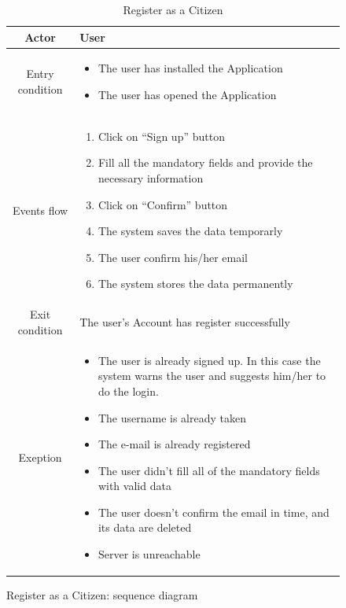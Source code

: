 \documentclass{article}
\begin{document}
	\begin{figure}[H]
	
		\begin{table} [H]
		\begin{center}
		\caption{Register as a Citizen}
		\begin{tabular}{|c|p{8cm}|}
			\hline
			Actor			&	User\\
			\hline
			Entry condition	&	\begin{itemize}[noitemsep,topsep=0pt]
									\item The user has installed the Application
									\item The user has opened the Application
								\end{itemize}\\
			\hline
			Events flow 		& 	\begin{enumerate}[noitemsep,topsep=0pt]
									\item Click on “Sign up” button
									\item Fill all the mandatory fields and provide the
									 necessary information
									\item Click on “Confirm” button
									\item The system saves the data temporarly
									\item The user confirm his/her email
									\item The system stores the data permanently
								\end{enumerate}\\
			\hline
			Exit condition	& 	The user's Account has register successfully\\
			\hline
			Exeption 		& 	\begin{itemize}[noitemsep,topsep=0pt]
									\item The user is already signed up.
									In this case the system warns the user and suggests
									 him/her to do the login.
									\item The username is already taken
									\item The e-mail is already registered
									\item The user didn’t fill all of the mandatory fields 
									with valid data
									\item The user doesn't confirm the email in time, 
									and its data are deleted
									\item Server is unreachable
								\end{itemize}\\
			\hline
		\end{tabular}	
		\end{center}
		\end{table} 
	
		\centering
		\def\svgwidth{\columnwidth}
		
		\caption{Register as a Citizen: sequence diagram}
		
	\end{figure}
\end{document}
